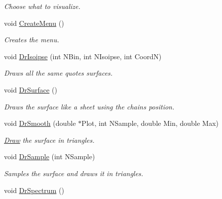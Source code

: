 \begin{DoxyCompactItemize}
\begin{DoxyCompactList}\small\item\em Choose what to visualize. \end{DoxyCompactList}\item 
void \hyperlink{classElPoly_a8b0db33648473b19696bb19c6282dc81}{Create\+Menu} ()\hypertarget{classElPoly_a8b0db33648473b19696bb19c6282dc81}{}\label{classElPoly_a8b0db33648473b19696bb19c6282dc81}

\begin{DoxyCompactList}\small\item\em Creates the menu. \end{DoxyCompactList}\item 
void \hyperlink{classElPoly_a145b3b6aa1385444c9ea75dd93b94111}{Dr\+Isoipse} (int N\+Bin, int N\+Isoipse, int CoordN)\hypertarget{classElPoly_a145b3b6aa1385444c9ea75dd93b94111}{}\label{classElPoly_a145b3b6aa1385444c9ea75dd93b94111}

\begin{DoxyCompactList}\small\item\em Draws all the same quotes surfaces. \end{DoxyCompactList}\item 
void \hyperlink{classElPoly_a892423f6e9f004d290645c0aefa7caee}{Dr\+Surface} ()\hypertarget{classElPoly_a892423f6e9f004d290645c0aefa7caee}{}\label{classElPoly_a892423f6e9f004d290645c0aefa7caee}

\begin{DoxyCompactList}\small\item\em Draws the surface like a sheet using the chains position. \end{DoxyCompactList}\item 
void \hyperlink{classElPoly_a7681bc74a114ac4d7c4503a9dc39e957}{Dr\+Smooth} (double $\ast$Plot, int N\+Sample, double Min, double Max)\hypertarget{classElPoly_a7681bc74a114ac4d7c4503a9dc39e957}{}\label{classElPoly_a7681bc74a114ac4d7c4503a9dc39e957}

\begin{DoxyCompactList}\small\item\em \hyperlink{classDraw}{Draw} the surface in triangles. \end{DoxyCompactList}\item 
void \hyperlink{classElPoly_a8a67d62cbd0dd7489e799e2f7871fb74}{Dr\+Sample} (int N\+Sample)\hypertarget{classElPoly_a8a67d62cbd0dd7489e799e2f7871fb74}{}\label{classElPoly_a8a67d62cbd0dd7489e799e2f7871fb74}

\begin{DoxyCompactList}\small\item\em Samples the surface and draws it in triangles. \end{DoxyCompactList}\item 
void \hyperlink{classElPoly_a487c5fd53a9d6527b47cfd003422be58}{Dr\+Spectrum} ()\hypertarget{classElPoly_a487c5fd53a9d6527b47cfd003422be58}{}\label{classElPoly_a487c5fd53a9d6527b47cfd003422be58}


\end{DoxyCompactItemize}

